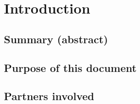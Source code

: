 \section{Introduction}

\subsection{Summary (abstract)}


\subsection{Purpose of this document}


\subsection{Partners involved}

